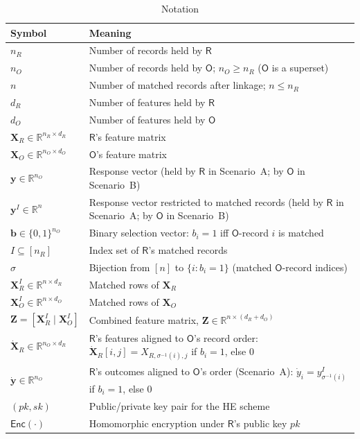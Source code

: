\documentclass[12pt]{article}
\theoremstyle{definition}
\theoremstyle{plain}
\newcommand{\R}{\mathbb{R}}
\newcommand{\Enc}[1]{\mathsf{Enc}\!\left(#1\right)}
\newcommand{\bXR}{\mathbf{X}_{R}}
\newcommand{\bXO}{\mathbf{X}_{O}}
\newcommand{\bXRI}{\mathbf{X}_{R}^{I}}
\newcommand{\bXOI}{\mathbf{X}_{O}^{I}}
\newcommand{\bZ}{\mathbf{Z}}
\newcommand{\by}{\mathbf{y}}
\newcommand{\bb}{\mathbf{b}}
\newcommand{\dXR}{\dot{\mathbf{X}}_{R}}
\newcommand{\dy}{\dot{\mathbf{y}}}
\newcommand{\Party}[1]{\textsf{#1}}
\newcommand{\pk}{\mathit{pk}}
\newcommand{\sk}{\mathit{sk}}
\begin{document}
\begin{table}[ht]
\centering
\caption{Notation}
\label{tab:notation}
\renewcommand{\arraystretch}{1.35}
\begin{tabular}{@{}l>{\raggedright\arraybackslash}p{8.6cm}@{}}
\toprule
\textbf{Symbol} & \textbf{Meaning} \\
\midrule
$n_{R}$ & Number of records held by $\Party{R}$ \\
$n_{O}$ & Number of records held by $\Party{O}$; $n_{O} \geq n_{R}$ ($\Party{O}$ is a superset) \\
$n$ & Number of matched records after linkage; $n \leq n_{R}$ \\
$d_{R}$ & Number of features held by $\Party{R}$ \\
$d_{O}$ & Number of features held by $\Party{O}$ \\
$\bXR \in \R^{n_{R} \times d_{R}}$ & $\Party{R}$'s feature matrix \\
$\bXO \in \R^{n_{O} \times d_{O}}$ & $\Party{O}$'s feature matrix \\
$\by \in \R^{n_{O}}$ & Response vector (held by $\Party{R}$ in Scenario~A; by $\Party{O}$ in Scenario~B) \\
$\by^{I} \in \R^{n}$ & Response vector restricted to matched records
  (held by $\Party{R}$ in Scenario~A; by $\Party{O}$ in Scenario~B) \\
$\bb \in \{0,1\}^{n_{O}}$ & Binary selection vector: $b_{i}=1$ iff $\Party{O}$-record $i$ is matched \\
$I \subseteq [n_{R}]$ & Index set of $\Party{R}$'s matched records \\
$\sigma$ & Bijection from $[n]$ to $\{i : b_{i}=1\}$ (matched $\Party{O}$-record indices) \\
$\bXRI \in \R^{n \times d_{R}}$ & Matched rows of $\bXR$ \\
$\bXOI \in \R^{n \times d_{O}}$ & Matched rows of $\bXO$ \\
$\bZ = [\bXRI \mid \bXOI]$ & Combined feature matrix, $\bZ \in \R^{n \times (d_{R}+d_{O})}$ \\
$\dXR \in \R^{n_{O} \times d_{R}}$ & $\Party{R}$'s features aligned to $\Party{O}$'s record order:
  $\dXR[i,j] = X_{R,\sigma^{-1}(i),j}$ if $b_{i}=1$, else $0$ \\
$\dy \in \R^{n_{O}}$ & $\Party{R}$'s outcomes aligned to $\Party{O}$'s order (Scenario~A):
  $\dot{y}_{i} = y^{I}_{\sigma^{-1}(i)}$ if $b_{i}=1$, else $0$ \\
$(\pk, \sk)$ & Public/private key pair for the HE scheme \\
$\Enc{\cdot}$ & Homomorphic encryption under $\Party{R}$'s public key $\pk$ \\
\bottomrule
\end{tabular}
\end{table}
\end{document}
